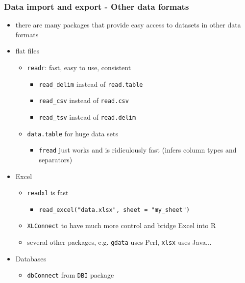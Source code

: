 \documentclass[xcolor={svgnames},10pt,
handout
]{beamer}
\begin{document}
\begin{frame}[fragile]
\frametitle{Data import and export - Other data formats}
\begin{itemize}
\item there are many packages that provide easy access to datasets in other data formats
\item flat files
\begin{itemize}
\item \lstinline|readr|: fast, easy to use, consistent
\begin{itemize}
	\item \lstinline|read_delim| instead of \lstinline|read.table|
	\item \lstinline|read_csv| instead of \lstinline|read.csv|
	\item \lstinline|read_tsv| instead of \lstinline|read.delim|
\end{itemize} 
\item \lstinline|data.table| for huge data sets
\begin{itemize}
	\item \lstinline|fread| just works and is ridiculously fast (infers column types and separators)
\end{itemize}
\end{itemize}
\item Excel
\begin{itemize}
	\item \lstinline|readxl| is fast
	\begin{itemize}
		\item \lstinline|read_excel("data.xlsx", sheet = "my_sheet")|
	\end{itemize}
	\item \lstinline|XLConnect| to have much more control and bridge Excel into R
	\item several other packages, e.g. \lstinline|gdata| uses Perl, \lstinline|xlsx| uses Java...
\end{itemize}
\item Databases
\begin{itemize}
	\item \lstinline|dbConnect| from \lstinline|DBI| package
\end{itemize}
\end{itemize}
\end{frame}
\end{document}
